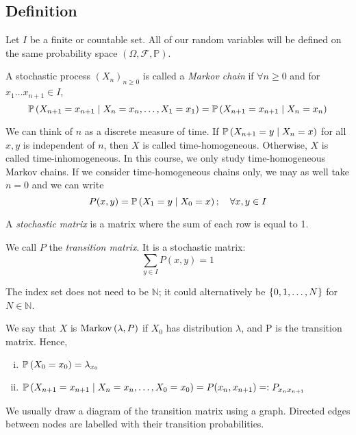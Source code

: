 \subsection{Definition}
Let \( I \) be a finite or countable set.
All of our random variables will be defined on the same probability space \( (\Omega, \mathcal F, \mathbb P) \).
\begin{definition}
A stochastic process \( (X_n)_{n \geq 0} \) is called a \textit{Markov chain} if \( \forall n \geq 0 \) and for \( x_1 \dots x_{n+1} \in I \),
\[ \mathbb{P}\left({X_{n+1} = x_{n+1} \mid X_n = x_n, \dots,X_1 = x_1}\right) = \mathbb{P}\left({X_{n+1} = x_{n+1} \mid X_n = x_n}\right) \]
\end{definition}
\noindent We can think of \( n \) as a discrete measure of time.
If \( \mathbb{P}\left({X_{n+1} = y \mid X_n = x}\right) \) for all \( x, y \) is independent of \( n \), then \( X \) is called time-homogeneous.
Otherwise, \( X \) is called time-inhomogeneous.
In this course, we only study time-homogeneous Markov chains.
If we consider time-homogeneous chains only, we may as well take \( n = 0 \) and we can write
\[ P(x,y) = \mathbb{P}\left({X_1 = y \mid X_0 = x}\right);\quad \forall x,y \in I \]
\begin{definition}
A \textit{stochastic matrix} is a matrix where the sum of each row is equal to 1.
\end{definition}
\noindent We call \( P \) the \textit{transition matrix}.
It is a stochastic matrix:
\[ \sum_{y \in I} P(x,y) = 1 \]
\begin{remark}
The index set does not need to be \( \mathbb N \); it could alternatively be \( \qty{0,1,\dots,N} \) for \( N \in \mathbb N \).
\end{remark}
We say that \( X \) is \(\operatorname{Markov}\left({\lambda, P}\right)\) if \( X_0 \) has distribution \(\lambda\), and P is the transition matrix.
Hence,
\begin{enumerate}[(i)]
\item \( \mathbb{P}\left({X_0 = x_0}\right) = \lambda_{x_0} \)
\item \( \mathbb{P}\left({X_{n+1} = x_{n+1} \mid X_n = x_n, \dots, X_0 = x_0}\right) = P(x_n, x_{n+1}) =: P_{x_n x_{n+1}} \)
\end{enumerate}
We usually draw a diagram of the transition matrix using a graph.
Directed edges between nodes are labelled with their transition probabilities.

